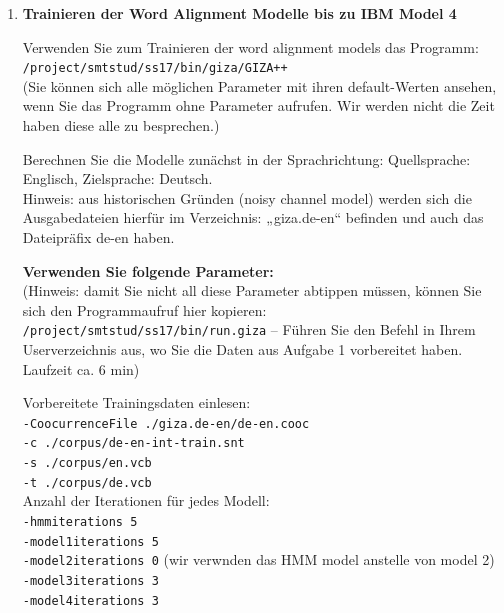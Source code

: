 \documentclass[12pt,fleqn]{article}
\begin{document}
\begin{enumerate}
\vspace{0.5cm} 
\item \textbf{Trainieren der Word Alignment Modelle bis zu IBM Model 4} 

\vspace{0.5cm} 
Verwenden Sie zum Trainieren der word alignment models das Programm: \\ 

\texttt{/project/smtstud/ss17/bin/giza/GIZA++ } \\ 

(Sie können sich alle möglichen Parameter mit ihren default-Werten ansehen, wenn Sie das Programm ohne Parameter aufrufen. Wir werden nicht die Zeit haben diese alle zu besprechen.)

\vspace{0.5cm} 
Berechnen Sie die Modelle zunächst in der Sprachrichtung: Quellsprache: Englisch, Zielsprache: Deutsch. \\
Hinweis: aus historischen Gründen (noisy channel model) werden sich die Ausgabedateien hierfür im Verzeichnis: „giza.de-en“ befinden und auch das Dateipräfix de-en haben.

\vspace{0.5cm} 

\textbf{Verwenden Sie folgende Parameter:} \\ 

(Hinweis: damit Sie nicht all diese Parameter abtippen müssen, können Sie sich den Programmaufruf hier kopieren: \texttt{/project/smtstud/ss17/bin/run.giza} – Führen Sie den Befehl in Ihrem Userverzeichnis aus, wo Sie die Daten aus Aufgabe 1 vorbereitet haben. Laufzeit ca. 6 min)


\vspace{0.5cm} 
Vorbereitete Trainingsdaten einlesen: \\
\texttt{-CoocurrenceFile	./giza.de-en/de-en.cooc}\\
\texttt{-c			./corpus/de-en-int-train.snt}\\
\texttt{-s 			./corpus/en.vcb} \\
\texttt{-t 			./corpus/de.vcb}\\


Anzahl der Iterationen für jedes Modell:\\
\texttt{-hmmiterations 	5}\\
\texttt{-model1iterations  	5} \\
\texttt{-model2iterations	0} (wir verwnden das HMM model anstelle von model 2)\\
\texttt{-model3iterations	3}\\
\texttt{-model4iterations	3}\\



\end{enumerate}
\end{document}
